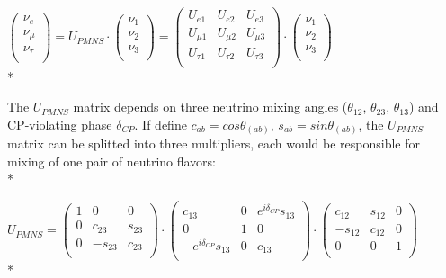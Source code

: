 $ \begin{pmatrix} \nu_{e} \\ \nu_{\mu} \\ \nu_{\tau} \\ \end{pmatrix}
 = U_{PMNS}\cdot \begin{pmatrix} \nu_{1} \\ \nu_{2} \\ \nu_{3} \\ \end{pmatrix} = 
 \begin{pmatrix}
  U_{e1} & U_{e2} & U_{e3} \\
  U_{\mu1} & U_{\mu2} & U_{\mu3} \\
  U_{\tau1} & U_{\tau2} & U_{\tau3} \\
 \end{pmatrix}
 \cdot
\begin{pmatrix} \nu_{1} \\ \nu_{2} \\ \nu_{3} \\ \end{pmatrix}$\\*

The $U_{PMNS}$ matrix depends on three neutrino mixing angles ($\theta_{12}$, $\theta_{23}$, $\theta_{13}$) and CP-violating phase $\delta_{CP}$. If define $c_{ab}=cos\theta_(ab)$, $s_{ab}=sin\theta_(ab)$, the $U_{PMNS}$ matrix can be splitted into three multipliers, each would be responsible for mixing of one pair of neutrino flavors:\\*

$U_{PMNS} =
 \begin{pmatrix}
  1 & 0 & 0 \\
  0 & c_{23} & s_{23} \\
  0 & -s_{23} & c_{23} \\
 \end{pmatrix}
 \cdot
 \begin{pmatrix}
  c_{13} & 0 & e^{i\delta_{CP}}s_{13} \\
  0 & 1 & 0 \\
  -e^{i\delta_{CP}}s_{13} & 0 & c_{13} \\
 \end{pmatrix}
 \cdot
 \begin{pmatrix}
  c_{12} & s_{12} & 0 \\
  -s_{12} & c_{12} & 0 \\
  0 & 0 & 1 \\
 \end{pmatrix}$ \\*

